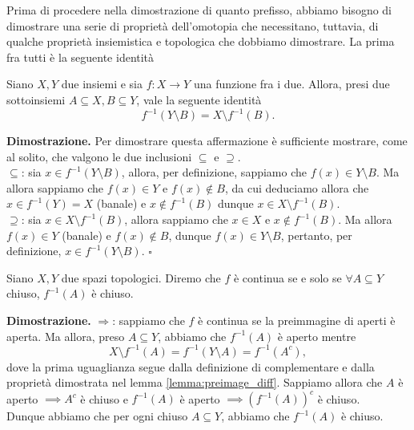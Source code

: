 Prima di procedere nella dimostrazione di quanto prefisso, abbiamo bisogno di dimostrare una serie di proprietà dell'omotopia che necessitano, tuttavia, di qualche proprietà insiemistica e topologica che dobbiamo dimostrare. La prima fra tutti è la seguente identità
%
\vspace{0.5cm}
\begin{lemma}
    Siano $X, Y$ due insiemi e sia $f: X \to Y$ una funzione fra i due. Allora, presi due sottoinsiemi $A \subseteq X, B \subseteq Y$, vale la seguente identità
    \begin{equation*}
        f^{-1}(Y \setminus B) = X \setminus f^{-1}(B).
    \end{equation*}
    \label{lemma:preimage_diff}
\end{lemma}
%
\noindent \textbf{Dimostrazione. }
    Per dimostrare questa affermazione è sufficiente mostrare, come al solito, che valgono le due inclusioni $\subseteq$ e $\supseteq$. \\
    $\boxed{\subseteq}$: sia $x \in f^{-1}(Y \setminus B)$, allora, per definizione, sappiamo che $f(x) \in Y \setminus B$. Ma allora sappiamo che $f(x) \in Y$ e $f(x) \not\in B$, da cui deduciamo allora che $x \in f^{-1}(Y) = X$ (banale) e $x \not\in f^{-1}(B)$ dunque $x \in X \setminus f^{-1}(B)$. \\
    $\boxed{\supseteq}$: sia $x \in X \setminus f^{-1}(B)$, allora sappiamo che $x \in X$ e $x \not\in f^{-1}(B)$. Ma allora $f(x) \in Y$ (banale) e $f(x) \not\in B$, dunque $f(x) \in Y \setminus B$, pertanto, per definizione, $x \in f^{-1}(Y \setminus B)$.
\hfill $\square$
%
\vspace{0.5cm}
\begin{lemma}
    Siano $X, Y$ due spazi topologici. Diremo che $f$ è continua se e solo se $\forall A \subseteq Y$ chiuso, $f^{-1}(A)$ è chiuso.
    \label{lemma:continuos_map_closed}
\end{lemma}
%
\noindent \textbf{Dimostrazione. }
    $\boxed{\Rightarrow}$: sappiamo che $f$ è continua se la preimmagine di aperti è aperta. Ma allora, preso $A \subseteq Y$, abbiamo che $f^{-1}(A)$ è aperto mentre
    $$
        X \setminus f^{-1}(A) = f^{-1}(Y \setminus A) = f^{-1}(A^c),
    $$
    dove la prima uguaglianza segue dalla definizione di complementare e dalla proprietà dimostrata nel lemma \ref{lemma:preimage_diff}. Sappiamo allora che $A$ è aperto $\implies A^c$ è chiuso e $f^{-1}(A)$ è aperto $\implies (f^{-1}(A))^c$ è chiuso. \\
    Dunque abbiamo che per ogni chiuso $A \subseteq Y$, abbiamo che $f^{-1}(A)$ è chiuso. \\

